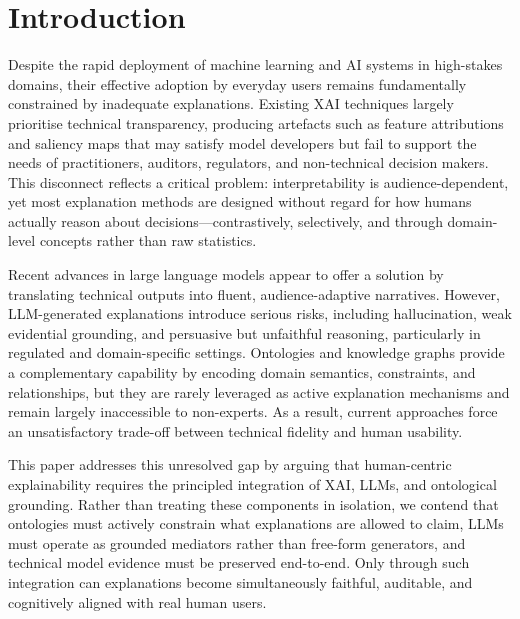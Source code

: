 \documentclass[lnbip]{svmultln}
\begin{document}
\section{Introduction}
Despite the rapid deployment of machine learning and AI systems in high-stakes domains, their effective adoption by everyday users remains fundamentally constrained by inadequate explanations. Existing XAI techniques largely prioritise technical transparency, producing artefacts such as feature attributions and saliency maps that may satisfy model developers but fail to support the needs of practitioners, auditors, regulators, and non-technical decision makers. This disconnect reflects a critical problem: interpretability is audience-dependent, yet most explanation methods are designed without regard for how humans actually reason about decisions---contrastively, selectively, and through domain-level concepts rather than raw statistics.

Recent advances in large language models appear to offer a solution by translating technical outputs into fluent, audience-adaptive narratives. However, LLM-generated explanations introduce serious risks, including hallucination, weak evidential grounding, and persuasive but unfaithful reasoning, particularly in regulated and domain-specific settings. Ontologies and knowledge graphs provide a complementary capability by encoding domain semantics, constraints, and relationships, but they are rarely leveraged as active explanation mechanisms and remain largely inaccessible to non-experts. As a result, current approaches force an unsatisfactory trade-off between technical fidelity and human usability.

This paper addresses this unresolved gap by arguing that human-centric explainability requires the principled integration of XAI, LLMs, and ontological grounding. Rather than treating these components in isolation, we contend that ontologies must actively constrain what explanations are allowed to claim, LLMs must operate as grounded mediators rather than free-form generators, and technical model evidence must be preserved end-to-end. Only through such integration can explanations become simultaneously faithful, auditable, and cognitively aligned with real human users.
\end{document}
